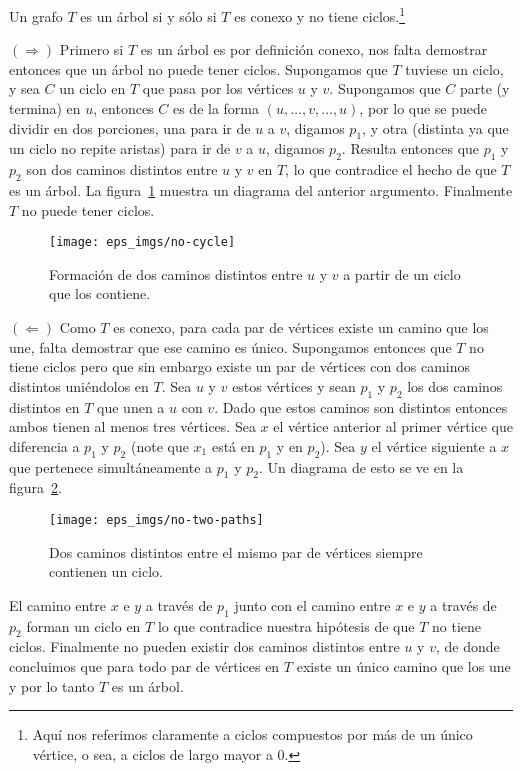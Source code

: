 \begin{teorema}
Un grafo $T$ es un árbol si y sólo si $T$ es conexo y no tiene ciclos.\footnote{Aquí nos referimos claramente a ciclos compuestos por más de un único vértice, o sea, a ciclos de largo mayor a 0.}

\begin{demostracion}
$(\Rightarrow)$ Primero si $T$ es un árbol es por definición conexo, nos falta demostrar entonces que un árbol no puede tener ciclos.
Supongamos que $T$ tuviese un ciclo, y sea $C$ un ciclo en $T$ que pasa por los vértices $u$ y $v$.
Supongamos que $C$ parte (y termina) en $u$, entonces $C$ es de la forma $(u,\ldots,v,\ldots,u)$, por lo que se puede dividir en dos porciones, una para ir de $u$ a $v$, digamos $p_1$, y otra (distinta ya que un ciclo no repite aristas) para ir de $v$ a $u$, digamos $p_2$.
Resulta entonces que $p_1$ y $p_2$ son dos caminos distintos entre $u$ y $v$ en $T$, lo que contradice el hecho de que $T$ es un árbol.
La figura~\ref{fig:no-cycle} muestra un diagrama del anterior argumento.
Finalmente $T$ no puede tener ciclos.
\begin{figure}[h!]
\centering
\texttt{[image: eps\_imgs/no-cycle]}
\caption{Formación de dos caminos distintos entre $u$ y $v$ a partir de un ciclo que los contiene.}
\label{fig:no-cycle}
\end{figure}

$(\Leftarrow)$ Como $T$ es conexo, para cada par de vértices existe un camino que los une, falta demostrar que ese camino es único.
Supongamos entonces que $T$ no tiene ciclos pero que sin embargo existe un par de vértices con dos caminos distintos uniéndolos en $T$.
Sea $u$ y $v$ estos vértices y sean $p_1$ y $p_2$ los dos caminos distintos en $T$ que unen a $u$ con $v$.
Dado que estos caminos son distintos entonces ambos tienen al menos tres vértices.
Sea $x$ el vértice anterior al primer vértice que diferencia a $p_1$ y $p_2$ (note que $x_1$ está en $p_1$ y en $p_2$).
Sea $y$ el vértice siguiente a $x$ que pertenece simultáneamente a $p_1$ y $p_2$.
Un diagrama de esto se ve en la figura~\ref{fig:no-two-paths}.
\begin{figure}[h!]
\centering
\texttt{[image: eps\_imgs/no-two-paths]}
\caption{Dos caminos distintos entre el mismo par de vértices siempre contienen un ciclo.}
\label{fig:no-two-paths}
\end{figure}
El camino entre $x$ e $y$ a través de $p_1$ junto con el camino entre $x$ e $y$ a través de $p_2$ forman un ciclo en $T$ lo que contradice nuestra hipótesis de que $T$ no tiene ciclos.
Finalmente no pueden existir dos caminos distintos entre $u$ y $v$, de donde concluimos que para todo par de vértices en $T$ existe un único camino que los une y por lo tanto $T$ es un árbol.
\end{demostracion}
\end{teorema}

